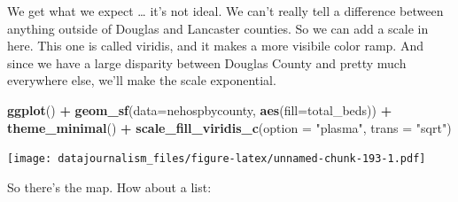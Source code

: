 \documentclass[]{book}
\newenvironment{Shaded}{\begin{snugshade}}{\end{snugshade}}
\newcommand{\DataTypeTok}[1]{\textcolor[rgb]{0.13,0.29,0.53}{#1}}
\newcommand{\KeywordTok}[1]{\textcolor[rgb]{0.13,0.29,0.53}{\textbf{#1}}}
\newcommand{\NormalTok}[1]{#1}
\newcommand{\OperatorTok}[1]{\textcolor[rgb]{0.81,0.36,0.00}{\textbf{#1}}}
\newcommand{\StringTok}[1]{\textcolor[rgb]{0.31,0.60,0.02}{#1}}
\begin{document}
We get what we expect \ldots{} it's not ideal. We can't really tell a difference between anything outside of Douglas and Lancaster counties. So we can add a scale in here. This one is called viridis, and it makes a more visibile color ramp. And since we have a large disparity between Douglas County and pretty much everywhere else, we'll make the scale exponential.

\begin{Shaded}
\begin{Highlighting}[]
\KeywordTok{ggplot}\NormalTok{() }\OperatorTok{+}\StringTok{ }
\StringTok{  }\KeywordTok{geom_sf}\NormalTok{(}\DataTypeTok{data=}\NormalTok{nehospbycounty, }\KeywordTok{aes}\NormalTok{(}\DataTypeTok{fill=}\NormalTok{total_beds)) }\OperatorTok{+}\StringTok{ }
\StringTok{  }\KeywordTok{theme_minimal}\NormalTok{() }\OperatorTok{+}\StringTok{ }
\StringTok{  }\KeywordTok{scale_fill_viridis_c}\NormalTok{(}\DataTypeTok{option =} \StringTok{"plasma"}\NormalTok{, }\DataTypeTok{trans =} \StringTok{"sqrt"}\NormalTok{)}
\end{Highlighting}
\end{Shaded}

\texttt{[image: datajournalism\_files/figure-latex/unnamed-chunk-193-1.pdf]}

So there's the map. How about a list:

\begin{Shaded}
\end{Shaded}
\end{document}
